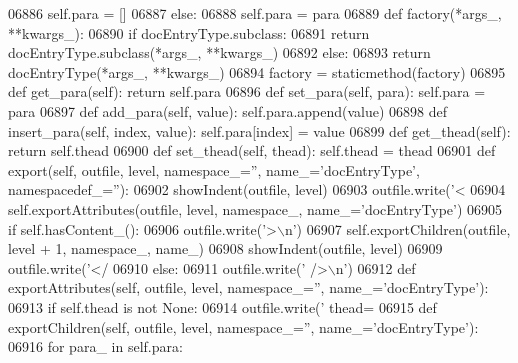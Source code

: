 \begin{DoxyCode}
{{{{{{{{{{{{{{{{{{{{{{{{{{{{{{{{{{{{{{{{{{{{{{{{{{{{{{{{{{{{{{{{{{{{{{{{{{{{{{{{{{{{{{{{{{{{{{{{{{{{{{{{{{{{{{{{{{{{{{{{{{{{{{{{{{{{{{{{{{{{{{{{{{{{{{{{{{{{{{{{{{{{{{{{{{{{{{{{{{{{{{{{{{{{{{{{{{{{{{{{{{{{{{{{{{{{{{{{{{{{{{{{{{{{{{{{{{{{{{{{{{{{{{{{{{{{{{{{{{{{{{{{{{{{{{{{{{{{{{{{{{{{{{{{{{{{{{{{{{{{{{{{{{{{{{{{{{{{{{{{{{{{{{{{{{{{{{{{{{{{{{{{{{{{{{{{{{{{{{{{{{{{{{{{{{{{{{{{{{{{{{{{{{{{{{{{{{{{{{{{{{{{{{{{{{{{{{{{{{{{{{{{06886             self.para = []
06887         \textcolor{keywordflow}{else}:
06888             self.para = para
06889     \textcolor{keyword}{def }factory(*args\_, **kwargs\_):
06890         \textcolor{keywordflow}{if} docEntryType.subclass:
06891             \textcolor{keywordflow}{return} docEntryType.subclass(*args\_, **kwargs\_)
06892         \textcolor{keywordflow}{else}:
06893             \textcolor{keywordflow}{return} docEntryType(*args\_, **kwargs\_)
06894     factory = staticmethod(factory)
06895     \textcolor{keyword}{def }get_para(self): \textcolor{keywordflow}{return} self.para
06896     \textcolor{keyword}{def }set_para(self, para): self.para = para
06897     \textcolor{keyword}{def }add_para(self, value): self.para.append(value)
06898     \textcolor{keyword}{def }insert_para(self, index, value): self.para[index] = value
06899     \textcolor{keyword}{def }get_thead(self): \textcolor{keywordflow}{return} self.thead
06900     \textcolor{keyword}{def }set_thead(self, thead): self.thead = thead
06901     \textcolor{keyword}{def }export(self, outfile, level, namespace\_='', name\_='docEntryType', namespacedef\_=''):
06902         showIndent(outfile, level)
06903         outfile.write(\textcolor{stringliteral}{'<%
06904         self.exportAttributes(outfile, level, namespace\_, name\_=\textcolor{stringliteral}{'docEntryType'})
06905         \textcolor{keywordflow}{if} self.hasContent_():
06906             outfile.write(\textcolor{stringliteral}{'>\(\backslash\)n'})
06907             self.exportChildren(outfile, level + 1, namespace\_, name\_)
06908             showIndent(outfile, level)
06909             outfile.write(\textcolor{stringliteral}{'</%
06910         \textcolor{keywordflow}{else}:
06911             outfile.write(\textcolor{stringliteral}{' />\(\backslash\)n'})
06912     \textcolor{keyword}{def }exportAttributes(self, outfile, level, namespace\_='', name\_='docEntryType'):
06913         \textcolor{keywordflow}{if} self.thead \textcolor{keywordflow}{is} \textcolor{keywordflow}{not} \textcolor{keywordtype}{None}:
06914             outfile.write(\textcolor{stringliteral}{' thead=%
06915     \textcolor{keyword}{def }exportChildren(self, outfile, level, namespace\_='', name\_='docEntryType'):
06916         \textcolor{keywordflow}{for} para\_ \textcolor{keywordflow}{in} self.para:
}}}}}}}}}}}}}}}}}}}}}}}}}}}}}}}}}}}}}}}}}}}}}}}}}}}}}}}}}}}}}}}}}}}}}}}}}}}}}}}}}}}}}}}}}}}}}}}}}}}}}}}}}}}}}}}}}}}}}}}}}}}}}}}}}}}}}}}}}}}}}}}}}}}}}}}}}}}}}}}}}}}}}}}}}}}}}}}}}}}}}}}}}}}}}}}}}}}}}}}}}}}}}}}}}}}}}}}}}}}}}}}}}}}}}}}}}}}}}}}}}}}}}}}}}}}}}}}}}}}}}}}}}}}}}}}}}}}}}}}}}}}}}}}}}}}}}}}}}}}}}}}}}}}}}}}}}}}}}}}}}}}}}}}}}}}}}}}}}}}}}}}}}}}}}}}}}}}}}}}}}}}}}}}}}}}}}}}}}}}}}}}}}}}}}}}}}}}}}}}}}}}}}}}}}}}}}}}}}}}}}}}}}}}
\end{DoxyCode}
